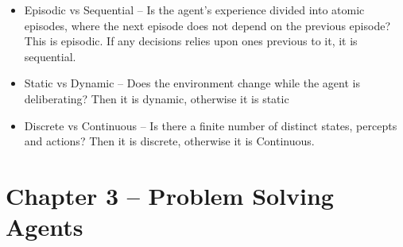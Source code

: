 \documentclass{article}
\begin{document}
\begin{itemize}
\begin{itemize}
		\item Episodic vs Sequential -- Is the agent's experience divided into atomic episodes, where the next episode does not depend on the previous episode? This is episodic. If any decisions relies upon ones previous to it, it is sequential.
		\item Static vs Dynamic -- Does the environment change while the agent is deliberating? Then it is dynamic, otherwise it is static
		\item Discrete vs Continuous -- Is there a finite number of distinct states, percepts and actions? Then it is discrete, otherwise it is Continuous. 
	\end{itemize}
\end{itemize}
\section*{Chapter 3 -- Problem Solving Agents}
\end{document}
